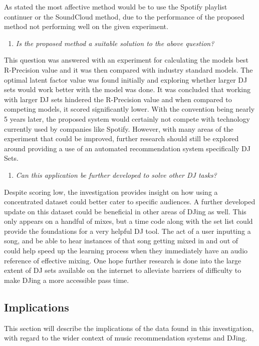 As stated the most affective method would be to use the Spotify playlist continuer or the SoundCloud method, due to the performance of the proposed method not performing well on the given experiment. 

\begin{enumerate}
	\item \textit{Is the proposed method a suitable solution to the above question?}
\end{enumerate}

This question was answered with an experiment for calculating the models best R-Precision value and it was then compared with industry standard models. The optimal latent factor value was found initially and exploring whether larger DJ sets would work better with the model was done. It was concluded that working with larger DJ sets hindered the R-Precision value and when compared to competing models, it scored significantly lower. With the convention being nearly 5 years later, the proposed system would certainly not compete with technology currently used by companies like Spotify. However, with many areas of the experiment that could be improved, further research should still be explored around providing a use of an automated recommendation system specifically DJ Sets.

\begin{enumerate}
	\item \textit{Can this application be further developed to solve other DJ tasks?}
\end{enumerate}

Despite scoring low, the investigation provides insight on how using a concentrated dataset could better cater to specific audiences. A further developed update on this dataset could be beneficial in other areas of DJing as well. This only appears on a handful of mixes, but a time code along with the set list could provide the foundations for a very helpful DJ tool. The act of a user inputting a song, and be able to hear instances of that song getting mixed in and out of could help speed up the learning process when they immediately have an audio reference of effective mixing. One hope further research is done into the large extent of DJ sets available on the internet to alleviate barriers of difficulty to make DJing a more accessible pass time. 

\subsection{Implications}
This section will describe the implications of the data found in this investigation, with regard to the
wider context of music recommendation systems and DJing.

